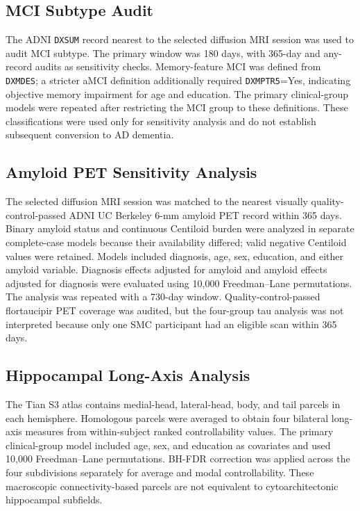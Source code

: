 \documentclass{article}
\begin{document}
\subsection{MCI Subtype Audit}
The ADNI \texttt{DXSUM} record nearest to the selected diffusion MRI session was used to audit MCI subtype. The primary window was 180 days, with 365-day and any-record audits as sensitivity checks. Memory-feature MCI was defined from \texttt{DXMDES}; a stricter aMCI definition additionally required \texttt{DXMPTR5}=Yes, indicating objective memory impairment for age and education. The primary clinical-group models were repeated after restricting the MCI group to these definitions. These classifications were used only for sensitivity analysis and do not establish subsequent conversion to AD dementia.

\subsection{Amyloid PET Sensitivity Analysis}
The selected diffusion MRI session was matched to the nearest visually quality-control-passed ADNI UC Berkeley 6-mm amyloid PET record within 365 days. Binary amyloid status and continuous Centiloid burden were analyzed in separate complete-case models because their availability differed; valid negative Centiloid values were retained. Models included diagnosis, age, sex, education, and either amyloid variable. Diagnosis effects adjusted for amyloid and amyloid effects adjusted for diagnosis were evaluated using 10,000 Freedman--Lane permutations. The analysis was repeated with a 730-day window. Quality-control-passed flortaucipir PET coverage was audited, but the four-group tau analysis was not interpreted because only one SMC participant had an eligible scan within 365 days.

\subsection{Hippocampal Long-Axis Analysis}
The Tian S3 atlas contains medial-head, lateral-head, body, and tail parcels in each hemisphere. Homologous parcels were averaged to obtain four bilateral long-axis measures from within-subject ranked controllability values. The primary clinical-group model included age, sex, and education as
covariates and used 10,000 Freedman--Lane permutations. BH-FDR correction
was applied across the four subdivisions separately for average and
modal controllability. These macroscopic connectivity-based parcels are not equivalent to cytoarchitectonic hippocampal subfields.
\end{document}
